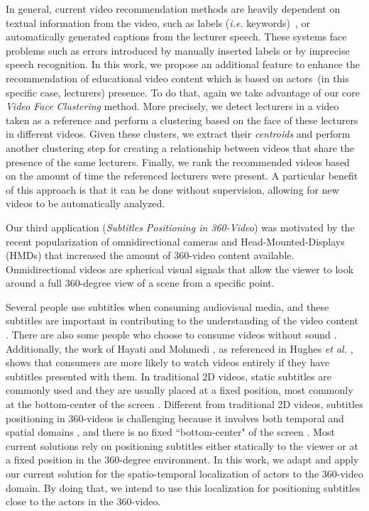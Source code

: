 In general, current video recommendation methods are heavily dependent on textual information from the video, such as labels (\textit{i.e.} keywords)~\cite{mahajan2015optimising,omisore2014personalized}, or automatically generated captions \cite{barrere2020utilizaccao} from the lecturer speech. These systems face problems such as errors introduced by manually inserted labels or by imprecise speech recognition.
In this work, we propose an additional feature to enhance the recommendation of educational video content which is based on actors~(in this specific case, lecturers) presence. To do that, again we take advantage of our core \emph{Video Face Clustering} method. More precisely, we detect lecturers in a video taken as a reference and perform a clustering based on the face of these lecturers in different videos. Given these clusters, we extract their \textit{centroids} and perform another clustering step for creating a relationship between videos that share the presence of the same lecturers. Finally, we rank the recommended videos based on the amount of time the referenced lecturers were present.
A particular benefit of this approach is that it can be done without supervision, allowing for new videos to be automatically analyzed.

Our third application (\emph{Subtitles Positioning in 360-Video}) was motivated by the recent popularization of omnidirectional cameras and Head-Mounted-Displays (HMDs) that increased the amount of 360-video content available. Omnidirectional videos are spherical visual signals that allow the viewer to look around a full 360-degree view of a scene from a specific point.

Several people use subtitles when consuming audiovisual media, and these subtitles are important in contributing to the understanding of the video content \cite{brown_subtitles_2017}. There are also some people who choose to consume videos without sound \cite{hughes_disruptive_2019}. Additionally, the work of Hayati and Mohmedi \cite{hayati2011effect}, as referenced in Hughes \emph{et al.} \cite{hughes_disruptive_2019}, shows that consumers are more likely to watch videos entirely if they have subtitles presented with them. In traditional 2D videos, static subtitles are commonly used and they are usually placed at a fixed position, most commonly at the bottom-center of the screen \cite{rothe_dynamic_2018}.
Different from traditional 2D videos, subtitles positioning in 360-videos is challenging because it involves both temporal and spatial domains \cite{agullo2019making}, and there is no fixed ``bottom-center" of the screen \cite{brown_subtitles_2017}. Most current solutions rely on positioning subtitles either statically to the viewer or at a fixed position in the 360-degree environment. 
In this work, we adapt and apply our current solution for the spatio-temporal localization of actors to the 360-video domain. By doing that, we intend to use this localization for positioning subtitles close to the actors in the 360-video.

